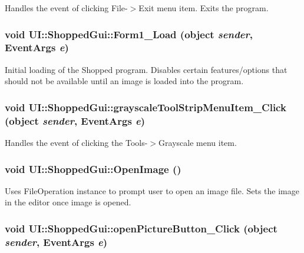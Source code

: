 \label{class_u_i_1_1_shopped_gui_a4c3239cc225d230bafb0cc53a9f49e2c}
Handles the event of clicking File-\/$>$Exit menu item. Exits the program. \hypertarget{class_u_i_1_1_shopped_gui_ad9bcb5a3a89de53a6ef580bd806fae26}{
\subsubsection[{Form1\_\-Load}]{\setlength{\rightskip}{0pt plus 5cm}void UI::ShoppedGui::Form1\_\-Load (object {\em sender}, \/  EventArgs {\em e})}}
\label{class_u_i_1_1_shopped_gui_ad9bcb5a3a89de53a6ef580bd806fae26}
Initial loading of the Shopped program. Disables certain features/options that should not be available until an image is loaded into the program. \hypertarget{class_u_i_1_1_shopped_gui_a9bfb029eb21eb1c7c4fddcee35d1d9fc}{
\subsubsection[{grayscaleToolStripMenuItem\_\-Click}]{\setlength{\rightskip}{0pt plus 5cm}void UI::ShoppedGui::grayscaleToolStripMenuItem\_\-Click (object {\em sender}, \/  EventArgs {\em e})}}
\label{class_u_i_1_1_shopped_gui_a9bfb029eb21eb1c7c4fddcee35d1d9fc}
Handles the event of clicking the Tools-\/$>$Grayscale menu item. \hypertarget{class_u_i_1_1_shopped_gui_a3a27f074b7b204b1df148921a0dcc20c}{
\subsubsection[{OpenImage}]{\setlength{\rightskip}{0pt plus 5cm}void UI::ShoppedGui::OpenImage ()}}
\label{class_u_i_1_1_shopped_gui_a3a27f074b7b204b1df148921a0dcc20c}
Uses FileOperation instance to prompt user to open an image file. Sets the image in the editor once image is opened. \hypertarget{class_u_i_1_1_shopped_gui_a5a4be38d87e3d968e9336400e572b646}{
\subsubsection[{openPictureButton\_\-Click}]{\setlength{\rightskip}{0pt plus 5cm}void UI::ShoppedGui::openPictureButton\_\-Click (object {\em sender}, \/  EventArgs {\em e})}}
